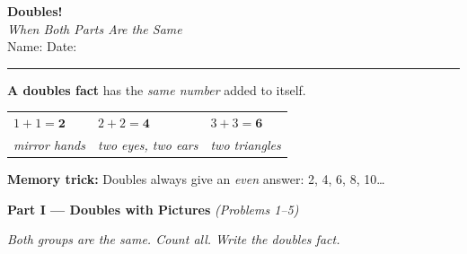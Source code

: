 \documentclass[12pt, letterpaper]{article}
\newcommand{\answerline}{\underline{\hspace{2.5cm}}}
\newcommand{\biganswerline}{\underline{\hspace{4cm}}}
\begin{document}
\begin{center}
  {\LARGE\textbf{\textcolor{scholared}{Doubles!}}}\\[4pt]
  {\Large\textcolor{scholagold}{\textit{When Both Parts Are the Same}}}\\[6pt]
  {\small Name: \biganswerline \hspace{1cm} Date: \answerline}
\end{center}

\vspace{4pt}
\noindent\textcolor{scholared}{\rule{\linewidth}{1pt}}
\vspace{4pt}


\begin{lessonbox}
\textbf{A doubles fact} has the \emph{same number} added to itself.\\[6pt]
\noindent
\begin{tabular}{@{}p{3.5cm} p{3.5cm} p{3.5cm}@{}}
$1 + 1 = \mathbf{2}$ & $2 + 2 = \mathbf{4}$ & $3 + 3 = \mathbf{6}$ \\[4pt]
\textit{mirror hands} & \textit{two eyes, two ears} & \textit{two triangles}
\end{tabular}

\medskip
\noindent\textbf{Memory trick:} Doubles always give an \emph{even} answer: 2, 4, 6, 8, 10\ldots
\end{lessonbox}

\bigskip

\noindent\textcolor{scholared}{\large\textbf{Part I — Doubles with Pictures}} \hfill \textit{(Problems 1–5)}

\medskip
\noindent\textit{Both groups are the same. Count all. Write the doubles fact.}

\bigskip
\end{document}
